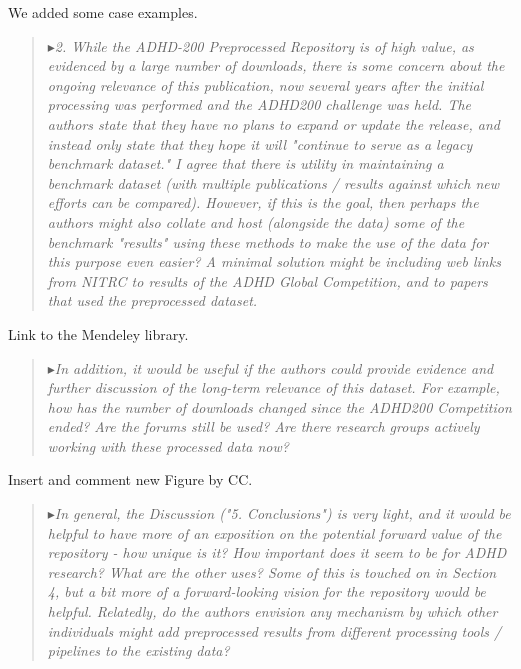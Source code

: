 \documentclass[authoryear,3p]{elsarticle}
\begin{document}
We added some case examples. 

\begin{quote}
$\blacktriangleright$\emph{2. While the ADHD-200 Preprocessed Repository is of high value, as evidenced by a large number of downloads, there is some concern about the ongoing relevance of this publication, now several years after the initial processing was performed and the ADHD200 challenge was held. The authors state that they have no plans to expand or update the release, and instead only state that they hope it will "continue to serve as a legacy benchmark dataset."  I agree that there is utility in maintaining a benchmark dataset (with multiple publications / results against which new efforts can be compared). However, if this is the goal, then perhaps the authors might also collate and host (alongside the data) some of the benchmark "results" using these methods to make the use of the data for this purpose even easier?  A minimal solution might be including web links from NITRC to results of the ADHD Global Competition, and to papers that used the preprocessed dataset.
}
\end{quote}

Link to the Mendeley library. 

\begin{quote}
$\blacktriangleright$\emph{In addition, it would be useful if the authors could provide evidence and further discussion of the long-term relevance of this dataset. For example, how has the number of downloads changed since the ADHD200 Competition ended?  Are the forums still be used?  Are there research groups actively working with these processed data now?}
\end{quote}

Insert and comment new Figure by CC. 

\begin{quote}
$\blacktriangleright$\emph{In general, the Discussion ("5. Conclusions") is very light, and it would be helpful to have more of an exposition on the potential forward value of the repository - how unique is it?  How important does it seem to be for ADHD research?  What are the other uses?  Some of this is touched on in Section 4, but a bit more of a forward-looking vision for the repository would be helpful.  Relatedly, do the authors envision any mechanism by which other individuals might add preprocessed results from different processing tools / pipelines to the existing data?
}
\end{quote}
\end{document}
